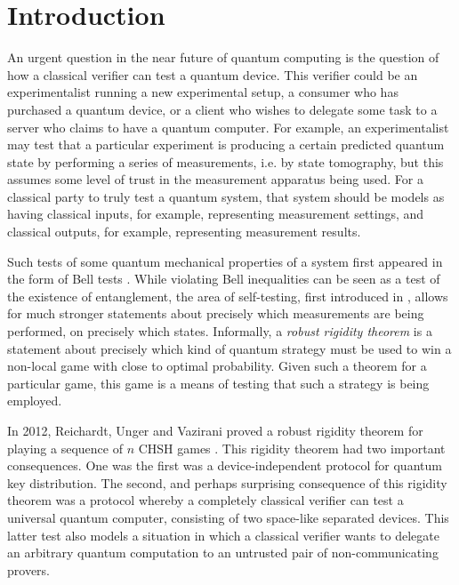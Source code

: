 \documentclass[11pt]{article}
\theoremstyle{remark}
\theoremstyle{definition}
\begin{document}
\section{Introduction}

An urgent question in the near future of quantum computing is the question of how a classical verifier can test a quantum device. This verifier could be an experimentalist running a new experimental setup, a consumer who has purchased a quantum device, or a client who wishes to delegate some task to a server who claims to have a quantum computer. For example, an experimentalist may test that a particular experiment is producing a certain predicted quantum state by performing a series of measurements, i.e. by state tomography, but this assumes some level of trust in the measurement apparatus being used. For a classical party to truly test a quantum system, that system should be models as having classical inputs, for example, representing measurement settings, and classical outputs, for example, representing measurement results. 

Such tests of some quantum mechanical properties of a system first appeared in the form of Bell tests \cite{}. While violating Bell inequalities can be seen as a test of the existence of entanglement, the area of self-testing, first introduced in \cite{mayers2004selftesting}, allows for much stronger statements about precisely which measurements are being performed, on precisely which states.  Informally, a \emph{robust rigidity theorem} is a statement about precisely which kind of quantum strategy must be used to win a non-local game with close to optimal probability. Given such a theorem for a particular game, this game is a means of testing that such a strategy is being employed. 

In 2012, Reichardt, Unger and Vazirani proved a robust rigidity theorem for playing a sequence of $n$ CHSH games \cite{reichardt2010classical}. This rigidity theorem had two important consequences. One was the first was a device-independent protocol for quantum key distribution. The second, and perhaps surprising consequence of this rigidity theorem was a protocol whereby a completely classical verifier can test a universal quantum computer, consisting of two space-like separated devices. This latter test also models a situation in which a classical verifier wants to delegate an arbitrary quantum computation to an untrusted pair of non-communicating provers.
\end{document}
